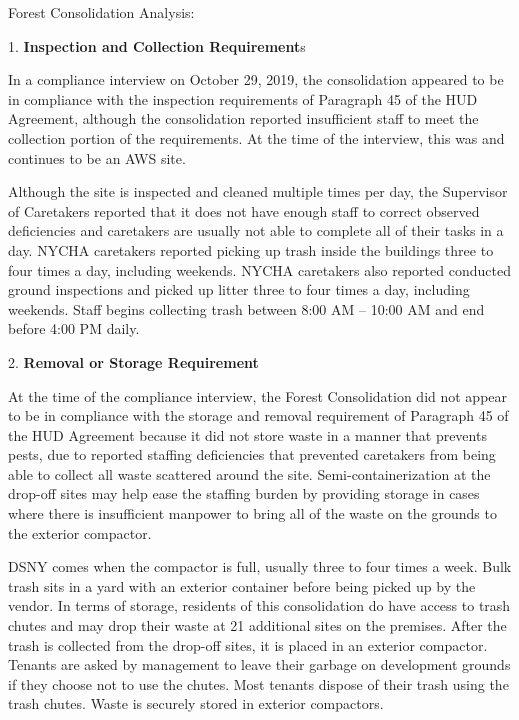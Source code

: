 Forest Consolidation Analysis: 

1.     \textbf{Inspection and Collection Requirement}s 

In a compliance interview on October 29, 2019, the consolidation appeared to be in compliance with the inspection requirements of Paragraph 45 of the HUD Agreement, although the consolidation reported insufficient staff to meet the collection portion of the requirements. At the time of the interview, this was and continues to be an AWS site.  

Although the site is inspected and cleaned multiple times per day, the Supervisor of Caretakers reported that it does not have enough staff to correct observed deficiencies and caretakers are usually not able to complete all of their tasks in a day. NYCHA caretakers reported picking up trash inside the buildings three to four times a day, including weekends. NYCHA caretakers also reported conducted ground inspections and picked up litter three to four times a day, including weekends. Staff begins collecting trash between 8:00 AM -- 10:00 AM and end before 4:00 PM daily.  

 

2.     \textbf{Removal or Storage Requirement} 

At the time of the compliance interview, the Forest Consolidation did not appear to be in compliance with the storage and removal requirement of Paragraph 45 of the HUD Agreement because it did not store waste in a manner that prevents pests, due to reported staffing deficiencies that prevented caretakers from being able to collect all waste scattered around the site.  Semi-containerization at the drop-off sites may help ease the staffing burden by providing storage in cases where there is insufficient manpower to bring all of the waste on the grounds to the exterior compactor. 

DSNY comes when the compactor is full, usually three to four times a week. Bulk trash sits in a yard with an exterior container before being picked up by the vendor. In terms of storage, residents of this consolidation do have access to trash chutes and may drop their waste at 21 additional sites on the premises.  After the trash is collected from the drop-off sites, it is placed in an exterior compactor. Tenants are asked by management to leave their garbage on development grounds if they choose not to use the chutes. Most tenants dispose of their trash using the trash chutes. Waste is securely stored in exterior compactors.  

